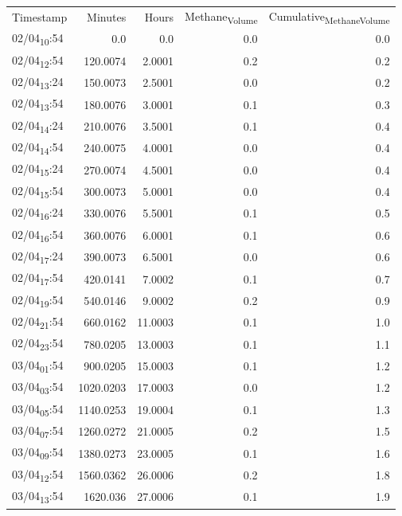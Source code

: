\documentclass[11pt]{article}
\begin{document}
\begin{center}
\begin{tabular}{lrrrr}
Timestamp & Minutes & Hours & Methane\textsubscript{Volume} & Cumulative\textsubscript{Methane}\textsubscript{Volume}\\[0pt]
02/04\textsubscript{10}:54 & 0.0 & 0.0 & 0.0 & 0.0\\[0pt]
02/04\textsubscript{12}:54 & 120.0074 & 2.0001 & 0.2 & 0.2\\[0pt]
02/04\textsubscript{13}:24 & 150.0073 & 2.5001 & 0.0 & 0.2\\[0pt]
02/04\textsubscript{13}:54 & 180.0076 & 3.0001 & 0.1 & 0.3\\[0pt]
02/04\textsubscript{14}:24 & 210.0076 & 3.5001 & 0.1 & 0.4\\[0pt]
02/04\textsubscript{14}:54 & 240.0075 & 4.0001 & 0.0 & 0.4\\[0pt]
02/04\textsubscript{15}:24 & 270.0074 & 4.5001 & 0.0 & 0.4\\[0pt]
02/04\textsubscript{15}:54 & 300.0073 & 5.0001 & 0.0 & 0.4\\[0pt]
02/04\textsubscript{16}:24 & 330.0076 & 5.5001 & 0.1 & 0.5\\[0pt]
02/04\textsubscript{16}:54 & 360.0076 & 6.0001 & 0.1 & 0.6\\[0pt]
02/04\textsubscript{17}:24 & 390.0073 & 6.5001 & 0.0 & 0.6\\[0pt]
02/04\textsubscript{17}:54 & 420.0141 & 7.0002 & 0.1 & 0.7\\[0pt]
02/04\textsubscript{19}:54 & 540.0146 & 9.0002 & 0.2 & 0.9\\[0pt]
02/04\textsubscript{21}:54 & 660.0162 & 11.0003 & 0.1 & 1.0\\[0pt]
02/04\textsubscript{23}:54 & 780.0205 & 13.0003 & 0.1 & 1.1\\[0pt]
03/04\textsubscript{01}:54 & 900.0205 & 15.0003 & 0.1 & 1.2\\[0pt]
03/04\textsubscript{03}:54 & 1020.0203 & 17.0003 & 0.0 & 1.2\\[0pt]
03/04\textsubscript{05}:54 & 1140.0253 & 19.0004 & 0.1 & 1.3\\[0pt]
03/04\textsubscript{07}:54 & 1260.0272 & 21.0005 & 0.2 & 1.5\\[0pt]
03/04\textsubscript{09}:54 & 1380.0273 & 23.0005 & 0.1 & 1.6\\[0pt]
03/04\textsubscript{12}:54 & 1560.0362 & 26.0006 & 0.2 & 1.8\\[0pt]
03/04\textsubscript{13}:54 & 1620.036 & 27.0006 & 0.1 & 1.9\\[0pt]

\end{tabular}
\end{center}
\end{document}
